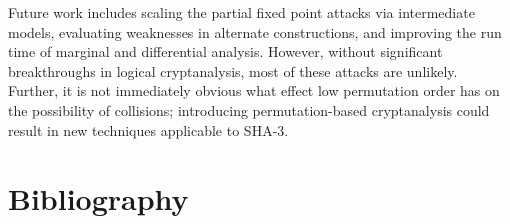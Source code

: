 \documentclass[10pt,twocolumn,twoside]{pnas-new}
\begin{document}
Future work includes scaling the partial fixed point attacks via intermediate
models, evaluating weaknesses in alternate constructions, and improving
the run time of marginal and differential analysis. However, without
significant breakthroughs in logical cryptanalysis, most of these attacks are
unlikely. Further, it is not immediately obvious what effect low permutation
order has on the possibility of collisions; introducing permutation-based
cryptanalysis could result in new techniques applicable to SHA-3.


\section{Bibliography} \label{sec:bibliography}


\end{document}
